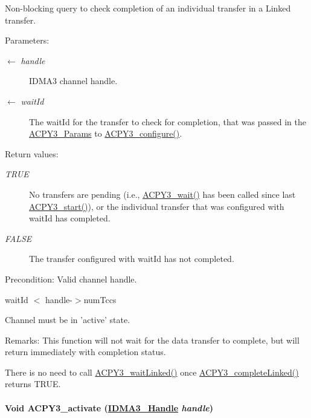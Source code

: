 Non-blocking query to check completion of an individual transfer in a Linked transfer. 

\begin{Desc}
\item[Parameters:]
\begin{description}
\item[\mbox{$\leftarrow$} {\em handle}]IDMA3 channel handle. \item[\mbox{$\leftarrow$} {\em wait\-Id}]The wait\-Id for the transfer to check for completion, that was passed in the \hyperlink{struct_a_c_p_y3___params}{ACPY3\_\-Params} to \hyperlink{group___d_s_p_a_c_p_y3_g427e8e4fd5c445b2f9bb5d971c06c099}{ACPY3\_\-configure()}.\end{description}
\end{Desc}
\begin{Desc}
\item[Return values:]
\begin{description}
\item[{\em TRUE}]No transfers are pending (i.e., \hyperlink{group___d_s_p_a_c_p_y3_g499bc0643a52f5cfd0828c1ce21cd69b}{ACPY3\_\-wait()} has been called since last \hyperlink{group___d_s_p_a_c_p_y3_gb4102200f00a9df3961a8374c0042bed}{ACPY3\_\-start()}), or the individual transfer that was configured with wait\-Id has completed. \item[{\em FALSE}]The transfer configured with wait\-Id has not completed.\end{description}
\end{Desc}
\begin{Desc}
\item[Precondition:]Valid channel handle. 

wait\-Id $<$ handle-$>$num\-Tccs 

Channel must be in 'active' state.\end{Desc}
\begin{Desc}
\item[Remarks:]This function will not wait for the data transfer to complete, but will return immediately with completion status. 

There is no need to call \hyperlink{group___d_s_p_a_c_p_y3_g6acf0b26cee48d5cbc81e2c9049128ea}{ACPY3\_\-wait\-Linked()} once \hyperlink{group___d_s_p_a_c_p_y3_g88a22e18670a97816b27dcd90abf2ae9}{ACPY3\_\-complete\-Linked()} returns TRUE. \end{Desc}
\hypertarget{group___d_s_p_a_c_p_y3_gf9dc07965774895d79323a47b36cc442}{
\paragraph[ACPY3\_\-activate]{\setlength{\rightskip}{0pt plus 5cm}Void ACPY3\_\-activate (\hyperlink{struct_i_d_m_a3___obj}{IDMA3\_\-Handle} {\em handle})}\hfill}
\label{group___d_s_p_a_c_p_y3_gf9dc07965774895d79323a47b36cc442}


